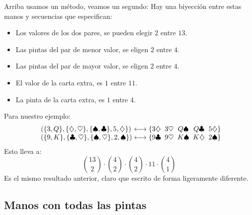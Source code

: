  Arriba usamos un método,
  veamos un segundo:
  Hay una biyección entre estas manos y secuencias que especifican:
  \begin{itemize}
  \item
    Los valores de los dos pares,
    se pueden elegir \(2\) entre \(13\).
  \item
    Las pintas del par de menor valor,
    se eligen \(2\) entre \(4\).
  \item
    Las pintas del par de mayor valor,
    se eligen \(2\) entre \(4\).
  \item
    El valor de la carta extra,
    es \(1\) entre \(11\).
  \item
    La pinta de la carta extra,
    es \(1\) entre \(4\).
  \end{itemize}
  Para nuestro ejemplo:
  \begin{equation*}
    \begin{array}{l@{{} \longleftrightarrow \{}*{4}{c@{\;\;}}c@{\}}}
      (\{3, Q\}, \{\diamondsuit, \heartsuit\},
	 \{\spadesuit, \clubsuit\},
       5, \diamondsuit\}) &
	 3 \diamondsuit & 3 \heartsuit & Q \spadesuit &
	 Q \clubsuit  & 5 \diamondsuit \\
      (\{9, K\}, \{\clubsuit, \heartsuit\},
	 \{\spadesuit, \heartsuit\},
       2, \spadesuit\})	  &
	 9 \clubsuit	& 9 \heartsuit & K \spadesuit &
	 K \diamondsuit & 2 \spadesuit
    \end{array}
  \end{equation*}
  Esto lleva a:
  \begin{equation*}
    \binom{13}{2} \cdot \binom{4}{2} \cdot \binom{4}{2} \cdot 11
      \cdot \binom{4}{1}
  \end{equation*}
  Es el mismo resultado anterior,
  claro que escrito de forma ligeramente diferente.

\subsection{Manos con todas las pintas}
\label{sec:todas-las-pintas}

